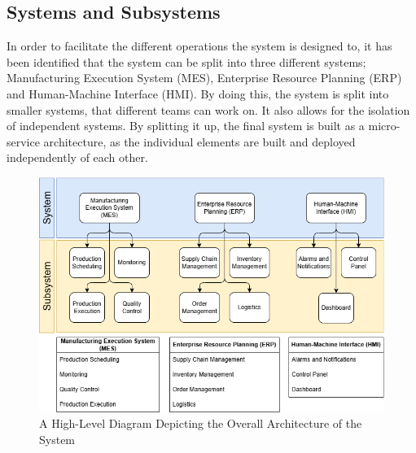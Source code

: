 



\subsection{Systems and Subsystems} %
\label{sec:systems-and-subsystems}

In order to facilitate the different operations the system is designed to, it has been identified that the system can be split into three different systems; Manufacturing Execution System (MES), Enterprise Resource Planning (ERP) and Human-Machine Interface (HMI). 
By doing this, the system is split into smaller systems, that different teams can work on. It also allows for the isolation of independent systems. 
By splitting it up, the final system is built as a micro-service architecture, as the individual elements are built and deployed independently of each other.

\begin{figure}[H]
    \centering
    \caption{\centering A High-Level Diagram Depicting the Overall Architecture of the System}
    \label{fig:systems_and_subsystems-system_diagram}
    \includegraphics[width=1\linewidth]{report/GroupTemplate/images/Systems&Subsystems.png}
\end{figure}


